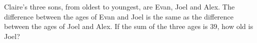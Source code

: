 Claire's three sons, from oldest to youngest, are Evan, Joel and Alex. The difference between the ages of Evan and Joel is the same as the difference between the ages of Joel and Alex. If the sum of the three ages is $39$, how old is Joel?
